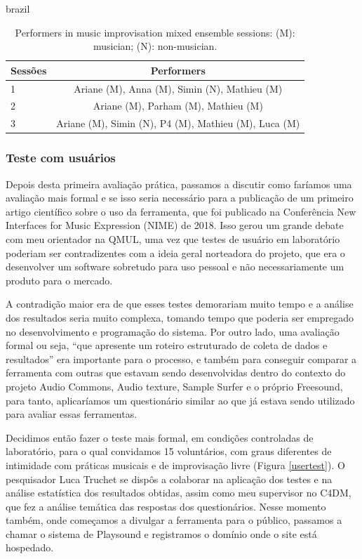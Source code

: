 \begin{otherlanguage*}{brazil}
\begin{table}
\centering
\caption{Performers in music improvisation mixed ensemble sessions: (M): musician; (N): non-musician.}
\begin{tabular}{|lc|} \hline
Sessões & Performers \\ \hline
1 & Ariane (M), Anna (M), Simin (N), Mathieu (M)\\ \hline
2 & Ariane (M), Parham (M), Mathieu (M) \\ \hline
3 & Ariane (M), Simin (N), P4 (M), Mathieu (M), Luca (M)\\
\hline\end{tabular}
\label{tab:puppets}
\end{table}

\subsubsection{Teste com usuários}

Depois desta primeira avaliação prática, passamos a discutir como faríamos uma avaliação mais formal e se isso seria necessário para a publicação de um primeiro artigo científico sobre o uso da ferramenta, que foi publicado na Conferência New Interfaces for Music Expression (NIME) de 2018. Isso gerou um grande debate com meu orientador na QMUL, uma vez que testes de usuário em laboratório poderiam ser contradizentes com a ideia geral norteadora do projeto, que era o desenvolver um software sobretudo para uso pessoal e não necessariamente um produto para o mercado. 


A contradição maior era de que esses testes demorariam muito tempo e a análise dos resultados seria muito complexa, tomando tempo que poderia ser empregado no desenvolvimento e programação do sistema. Por outro lado, uma avaliação formal ou seja, ``que apresente um roteiro estruturado de coleta de dados e resultados'' \cite{Stowell} era importante para o processo, e também para conseguir comparar a ferramenta com outras que estavam sendo desenvolvidas dentro do contexto do projeto Audio Commons, Audio texture, Sample Surfer e o próprio Freesound, para tanto, aplicaríamos um questionário similar ao que já estava sendo utilizado para avaliar essas ferramentas.


Decidimos então fazer o teste mais formal, em condições controladas de laboratório, para o qual convidamos 15 voluntários, com graus diferentes de intimidade com práticas musicais e de improvisação livre (Figura \ref{usertest}). O pesquisador Luca Truchet se dispôs a colaborar na aplicação dos testes e na análise estatística dos resultados obtidas, assim como meu supervisor no C4DM, que fez a análise temática das respostas dos questionários. Nesse momento também, onde começamos a divulgar a ferramenta para o público, passamos a chamar o sistema de Playsound e registramos o domínio onde o site está hospedado.



\end{otherlanguage*}
